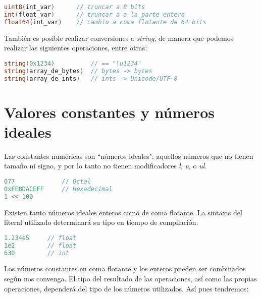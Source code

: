 \begin{minipage}{17.1cm}
\begin{lstlisting}[language=go,numbers=none]
uint8(int_var)		// truncar a 8 bits
int(float_var)		// truncar a a la parte entera
float64(int_var)	// cambio a coma flotante de 64 bits
\end{lstlisting}
\end{minipage}

También es posible realizar conversiones a \emph{string}, de manera que
podemos realizar las siguientes operaciones, entre otras:

\begin{minipage}{17.1cm}
\begin{lstlisting}[language=go,numbers=none]
string(0x1234)			// == "\u1234"
string(array_de_bytes)	// bytes -> bytes
string(array_de_ints)	// ints -> Unicode/UTF-8
\end{lstlisting}
\end{minipage}

\section{Valores constantes y números ideales}

Las constantes numéricas son ``números ideales": aquellos números que no tienen
tamaño ni signo, y por lo tanto no tienen modificadores \emph{l}, \emph{u},
o \emph{ul}.

\begin{minipage}{17.1cm}
\begin{lstlisting}[language=go,numbers=none]
077 			// Octal
0xFE8DACEFF 	// Hexadecimal
1 << 100
\end{lstlisting}
\end{minipage}

Existen tanto números ideales enteros como de coma flotante. La sintaxis del
literal utilizado determinará su tipo en tiempo de compilación.

\begin{minipage}{17.1cm}
\begin{lstlisting}[language=go,numbers=none]
1.234e5 	// float
1e2 		// float
630 		// int
\end{lstlisting}
\end{minipage}

Los números constantes en coma flotante y los enteros pueden ser combinados
según nos convenga. El tipo del resultado de las operaciones, así como las
propias operaciones, dependerá del tipo de los números utilizados. Así pues
tendremos:

